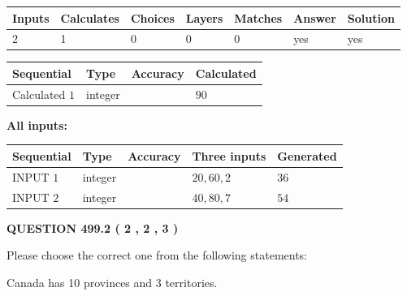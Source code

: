 \documentclass[12pt]{article}
\begin{document}
 

 
   
   
   
   
\noindent\begin{tabular}{|l|l|l|l|l|l|l|}
 \hline
Inputs & Calculates & Choices & Layers & Matches & Answer & Solution \\ \hline
 2  & 
 1  & 
 0
  & 
 0  & 
 0  & 
  yes & 
  yes 
  \\ \hline
 \end{tabular}
   
   
   
   
\noindent{}
   
   
  
  
\noindent\begin{tabular}{|l|l|l|l|}
\hline
 Sequential & Type & Accuracy & Calculated \\ 
\hline
 
 
  Calculated $  1 $ & integer &  & 
  $ 90 $ 
 \\  \hline  
 \end{tabular}
   
   
   
   
\noindent\vspace{0.1in}\hspace{-0.08in} {\textbf{\Large{All inputs: }}}
   
   
  
  
\noindent\begin{tabular}{|l|l|l|l|l|}
\hline
 Sequential & Type & Accuracy & Three inputs & Generated \\ 
\hline
 
 
  INPUT $  1 $ & integer &  & $
 20
 , 
 60
 , 
 2
 $ & $ 36 $ 
 \\  \hline  
 
 
  INPUT $  2 $ & integer &  & $
 40
 , 
 80
 , 
 7
 $ & $ 54 $ 
 \\  \hline  
 \end{tabular}
   
   
  
\vspace{0.2in}
  
{\textbf{\Large{QUESTION
499.2 
 ( 2 , 2 , 3 )
}}}
  
  
Please choose the correct one from the following statements:
 
 
Canada has 10  provinces and 3 territories.
 
\end{document}
